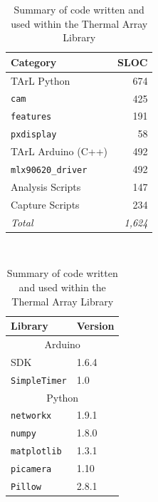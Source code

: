 \documentclass[../thesis/thesis.tex]{subfiles}
\begin{document}
\begin{table}
\centering
\begin{subtable}[b]{0.5\textwidth}
\centering
\begin{tabular}{|l|r|}
\hline
\textbf{Category} & \textbf{SLOC}  \\ \hline
TArL Python       & 674            \\ \hline
\hspace{5mm}\texttt{cam}        & 425           \\ \hline
\hspace{5mm}\texttt{features}   & 191           \\ \hline
\hspace{5mm}\texttt{pxdisplay}  & 58            \\ \hline
TArL Arduino (C++)  & 492            \\ \hline
\hspace{5mm}\texttt{mlx90620\_driver}  & 492          \\ \hline
Analysis Scripts  & 147            \\ \hline
Capture Scripts   & 234            \\ \hline
\textit{Total}    & \textit{1,624} \\ \hline
\end{tabular}
\caption{Source Lines Of Code written}
\end{subtable}%
~%
\begin{subtable}[b]{0.5\textwidth}
\centering
\begin{tabular}{|l|l|}
\hline
\textbf{Library}     & \multicolumn{1}{l|}{\textbf{Version}} \\ \hline
\multicolumn{2}{|c|}{Arduino}                                \\ \hline
SDK                  & 1.6.4                                 \\ \hline
\texttt{SimpleTimer} & 1.0                                   \\ \hline
\multicolumn{2}{|c|}{Python}                                 \\ \hline
\texttt{networkx}    & 1.9.1                                 \\ \hline
\texttt{numpy}       & 1.8.0                                 \\ \hline
\texttt{matplotlib}  & 1.3.1                                 \\ \hline
\texttt{picamera}    & 1.10                                  \\ \hline
\texttt{Pillow}      & 2.8.1                                 \\ \hline
\end{tabular}
\caption{Libraries used}
\end{subtable}
\caption{Summary of code written and used within the Thermal Array Library}
\end{table}
\end{document}
